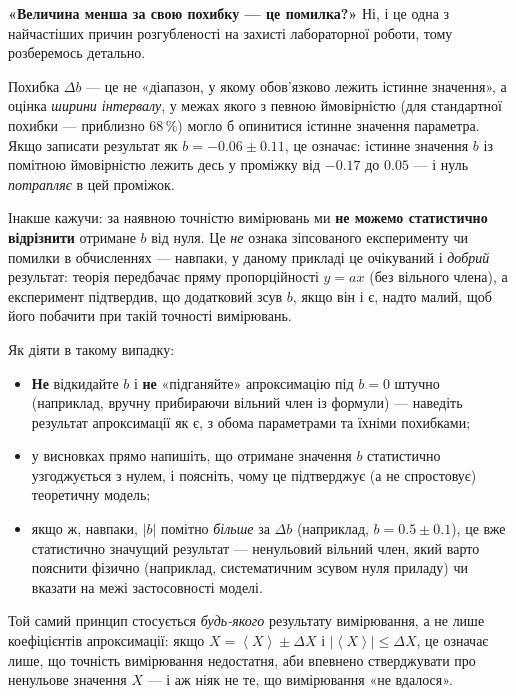 \begin{Warning}
	\textbf{«Величина менша за свою похибку --- це помилка?»} Ні, і
	це одна з найчастіших причин розгубленості на захисті лабораторної
	роботи, тому розберемось детально.

	Похибка $\Delta b$ --- це не «діапазон, у якому обов'язково лежить
	істинне значення», а оцінка \emph{ширини інтервалу}, у межах якого
	з певною ймовірністю (для стандартної похибки --- приблизно
	$68\,\%$) могло б опинитися істинне значення параметра. Якщо
	записати результат як $b = -0.06 \pm 0.11$, це означає: істинне
	значення $b$ із помітною ймовірністю лежить десь у проміжку від
	$-0.17$ до $0.05$ --- і нуль \emph{потрапляє} в цей проміжок.

	Інакше кажучи: за наявною точністю вимірювань ми \textbf{не можемо
	статистично відрізнити} отримане $b$ від нуля. Це \emph{не} ознака
	зіпсованого експерименту чи помилки в обчисленнях --- навпаки, у
	даному прикладі це очікуваний і \emph{добрий} результат: теорія
	передбачає пряму пропорційності $y = ax$ (без вільного члена), а
	експеримент підтвердив, що додатковий зсув $b$, якщо він і є, надто
	малий, щоб його побачити при такій точності вимірювань.

	Як діяти в такому випадку:
	\begin{itemize}
		\item \textbf{Не} відкидайте $b$ і \textbf{не} «підганяйте»
		апроксимацію під $b = 0$ штучно (наприклад, вручну прибираючи
		вільний член із формули) --- наведіть результат апроксимації
		як є, з обома параметрами та їхніми похибками;
		\item у висновках прямо напишіть, що отримане значення $b$
		статистично узгоджується з нулем, і поясніть, чому це підтверджує
		(а не спростовує) теоретичну модель;
		\item якщо ж, навпаки, $|b|$ помітно \emph{більше} за $\Delta b$
		(наприклад, $b = 0.5 \pm 0.1$), це вже статистично значущий
		результат --- ненульовий вільний член, який варто пояснити
		фізично (наприклад, систематичним зсувом нуля приладу) чи
		вказати на межі застосовності моделі.
	\end{itemize}

	Той самий принцип стосується \emph{будь-якого} результату
	вимірювання, а не лише коефіцієнтів апроксимації: якщо
	$X = \left\langle X \right\rangle \pm \Delta X$ і
	$\left|\left\langle X
    \right\rangle\right|
    \le
    \Delta X$,
це
	означає лише, що точність вимірювання недостатня, аби впевнено
	стверджувати про ненульове значення $X$ --- і аж ніяк не те, що
	вимірювання «не вдалося».
\end{Warning}

